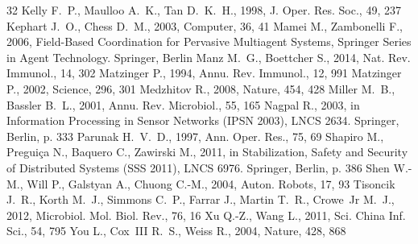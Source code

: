\documentclass[twoside,twocolumn,usenatbib]{mnras}
\begin{document}
\begin{thebibliography}{32}
 Kelly F.~P., Maulloo A.~K.,
  Tan D.~K.~H., 1998, J. Oper. Res. Soc., 49, 237
 Kephart J.~O., Chess D.~M.,
  2003, Computer, 36, 41
 Mamei M., Zambonelli F.,
  2006, Field-Based Coordination for Pervasive Multiagent Systems,
  Springer Series in Agent Technology. Springer, Berlin
 Manz M.~G., Boettcher S., 2014,
  Nat. Rev. Immunol., 14, 302
 Matzinger P., 1994,
  Annu. Rev. Immunol., 12, 991
 Matzinger P., 2002, Science, 296,
  301
 Medzhitov R., 2008, Nature,
  454, 428
 Miller M.~B., Bassler B.~L.,
  2001, Annu. Rev. Microbiol., 55, 165
 Nagpal R., 2003, in Information
  Processing in Sensor Networks (IPSN 2003), LNCS 2634. Springer,
  Berlin, p. 333
 Parunak H.~V.~D., 1997,
  Ann. Oper. Res., 75, 69
 Shapiro M., Pregui\c{c}a N.,
  Baquero C., Zawirski M., 2011, in Stabilization, Safety and Security
  of Distributed Systems (SSS 2011), LNCS 6976. Springer, Berlin,
  p. 386
 Shen W.-M., Will P., Galstyan A.,
  Chuong C.-M., 2004, Auton. Robots, 17, 93
 Tisoncik J.~R., Korth M.~J.,
  Simmons C.~P., Farrar J., Martin T.~R., Crowe~Jr M.~J., 2012,
  Microbiol. Mol. Biol. Rev., 76, 16
 Xu Q.-Z., Wang L., 2011, Sci. China
  Inf. Sci., 54, 795
 You L., Cox~III R.~S., Weiss R., 2004,
  Nature, 428, 868
\end{thebibliography}

\label{lastpage}
\end{document}
